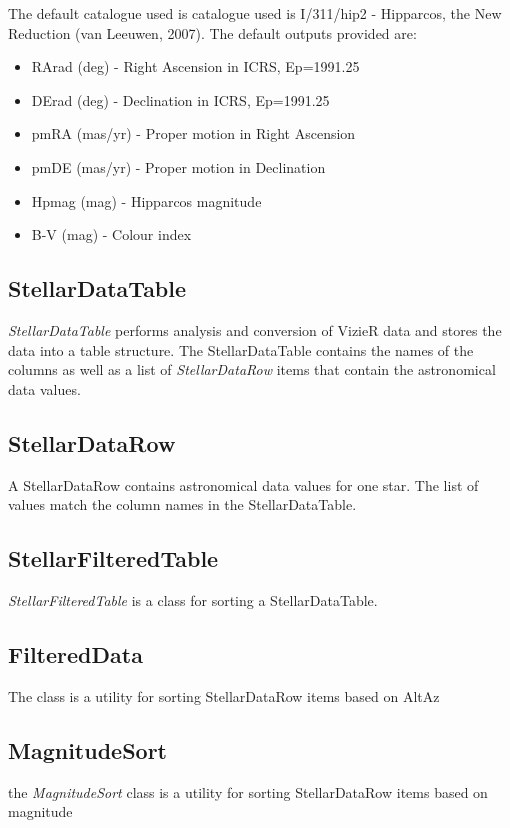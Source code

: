 The default catalogue used is catalogue used is I/311/hip2 - Hipparcos, the New Reduction (van Leeuwen, 2007). The default outputs provided are:

\begin{itemize}
	\item RArad (deg) -  Right Ascension in ICRS, Ep=1991.25 
	\item DErad (deg) -  Declination in ICRS, Ep=1991.25
	\item pmRA (mas/yr) -  Proper motion in Right Ascension
	\item pmDE (mas/yr) - Proper motion in Declination 
	\item Hpmag (mag) - Hipparcos magnitude
	\item B-V (mag) -  Colour index
\end{itemize}

 \subsection{StellarDataTable}
\textit{StellarDataTable} performs analysis and conversion of VizieR data   and stores the data into a table structure. The StellarDataTable contains the names of the columns as well as a list of \textit{StellarDataRow} items that contain the astronomical data values.

\subsection{StellarDataRow}
A StellarDataRow contains astronomical data values for one star. The list of values match the column names in the StellarDataTable.

\subsection{StellarFilteredTable}
\textit{StellarFilteredTable} is a class for sorting a StellarDataTable.

 \subsection{FilteredData}
The  class is a utility for sorting StellarDataRow items based on AltAz

\subsection{MagnitudeSort}
the \textit{MagnitudeSort} class is a utility for sorting StellarDataRow items based on magnitude


